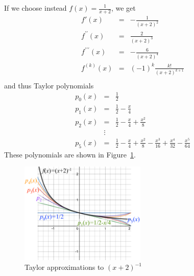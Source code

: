 If we choose instead
$f(x)=\frac{1}{x+2}$, we get
\begin{eqnarray*}
f'(x)&=&-\frac{1}{(x+2)^2}\\
f^{\prime\prime}(x)&=&\frac{2}{(x+2)^3}\\
f^{\prime\prime\prime}(x)&=&-\frac{6}{(x+2)^4}\\
f^{(k)}(x)&=&(-1)^k\frac{k!}{(x+2)^{k+1}}\\
\end{eqnarray*}
and thus Taylor polynomials
\begin{eqnarray*}
p_0(x)&=&\frac{1}{2}\\
p_1(x)&=&\frac{1}{2}-\frac{x}{4}\\
p_2(x)&=&\frac{1}{2}-\frac{x}{4}+\frac{x^2}{8}\\
&\vdots&\\
p_5(x)&=&\frac{1}{2}-\frac{x}{4}+\frac{x^2}{8}-\frac{x^3}{16}+\frac{x^4}{32}-\frac{x^5}{64}
\end{eqnarray*}
These polynomials are shown in Figure~\ref{figtayoneo}.
\begin{figure}
\begin{center}
\includegraphics[width=6cm]{pic/TaylorOneOverxP2.pdf}
\end{center}
\caption{Taylor approximations to $(x+2)^{-1}$}
\label{figtayoneo}
\end{figure}


